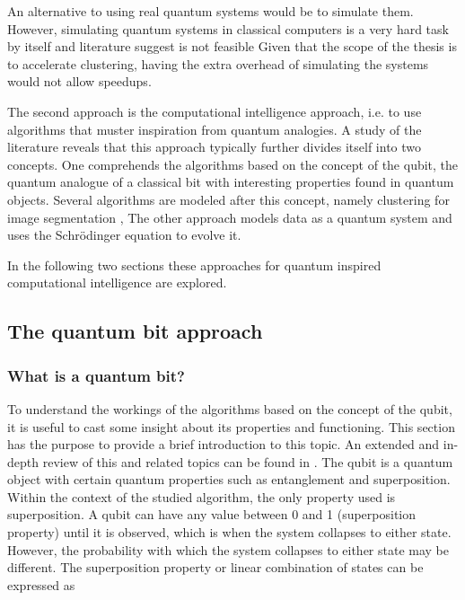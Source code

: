 An alternative to using real quantum systems would be to simulate them.
However, simulating quantum systems in classical computers is a very hard task by itself and literature suggest is not feasible \cite{Feynman1982}%
Given that the scope of the thesis is to accelerate clustering, having the extra overhead of simulating the systems would not allow speedups. 

The second approach is the computational intelligence approach, i.e. to use algorithms that muster inspiration from quantum analogies.
A study of the literature reveals that this approach typically further divides itself into two concepts.
One comprehends the algorithms based on the concept of the qubit, the quantum analogue of a classical bit with interesting properties found in quantum objects.
Several algorithms are modeled after this concept, namely clustering for image segmentation \cite{Casper2013,Casper,Xiao2010}, 
The other approach models data as a quantum system and uses the Schrödinger equation to evolve it.

In the following two sections these approaches for quantum inspired computational intelligence are explored.

\subsection{The quantum bit approach}
\label{sec:qubit}

\subsubsection{What is a quantum bit?}

To understand the workings of the algorithms based on the concept of the qubit, it is useful to cast some insight about its properties and functioning.
This section has the purpose to provide a brief introduction to this topic.
An extended and in-depth review of this and related topics can be found in \cite{Lanzagorta2008}.
The qubit is a quantum object with certain quantum properties such as entanglement and superposition.
Within the context of the studied algorithm, the only property used is superposition.
A qubit can have any value between 0 and 1 (superposition property) until it is observed, which is when the system collapses to either state.
However, the probability with which the system collapses to either state  may be different.
The superposition property or linear combination of states can be expressed as %

